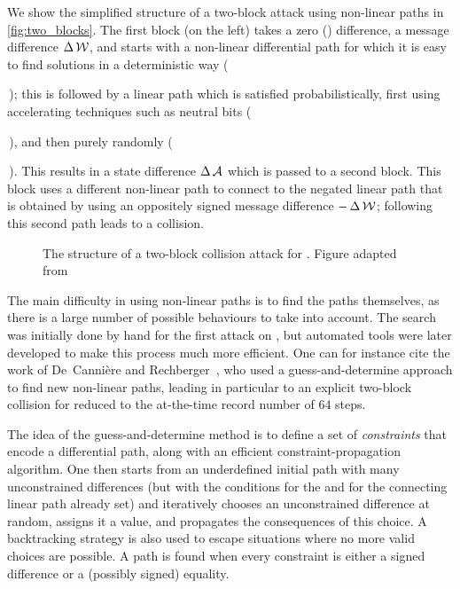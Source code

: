 We show the simplified structure of a two-block attack using non-linear paths in \autoref{fig:two_blocks}. The first block (on the left) takes a zero () \iv difference,
a message difference $\operatorname{\Delta}\mathcal{W}$, and starts with a non-linear differential path  for which it is easy to find solutions in a deterministic way
(\,\,); this is
followed by a linear path  which is satisfied probabilistically, first using accelerating techniques such as neutral bits (\,\,),
and then purely randomly (\,\,). This results in a state difference $\operatorname{\Delta}\mathcal{A}$ which is passed to a second block. This block
uses a different non-linear path  to connect to the negated linear path  that is obtained by using an oppositely signed message difference $-\operatorname{\Delta}\mathcal{W}$; following this second path leads to
a collision.

\begin{figure}[!htb]
\begin{centering}

\caption{The structure of a two-block collision attack for \sha. Figure adapted from~\cite{TiKZ:Cryptographers}\label{fig:two_blocks}}
\end{centering}
\end{figure}

\medskip

The main difficulty in using non-linear paths is to find the paths themselves, as there is a large number of possible behaviours to take into account.
The search was initially done by hand for the first attack on \shaone, but automated tools were later developed to make this process much
more efficient. One can for instance cite the work of De~Cannière and Rechberger~\cite{DBLP:conf/asiacrypt/CanniereR06}, who used a guess-and-determine
approach to find new non-linear paths, leading in particular to an explicit two-block collision for \shaone reduced to the at-the-time record number of 64 steps.

The idea of the guess-and-determine method is to define a set of \emph{constraints} that encode a differential path, along with an efficient constraint-propagation
algorithm. One then starts from an underdefined initial path with many unconstrained differences (but with the conditions for the \iv and for the connecting
linear path already set) and iteratively chooses an unconstrained difference at random, assigns it a value, and propagates the consequences of this choice.
A backtracking strategy is also used to escape situations where no more valid choices are possible. A path is found when every constraint is either a signed
difference or a (possibly signed) equality.

